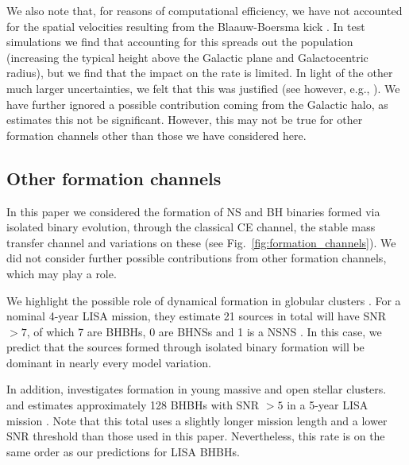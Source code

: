 We also note that, for reasons of computational efficiency, we have not accounted for the spatial velocities resulting from the Blaauw-Boersma kick \citep{Blaauw+1961,Boersma1961}. In test simulations we find that accounting for this spreads out the population (increasing the typical height above the Galactic plane and Galactocentric radius), but we find that the impact on the rate is limited. In light of the other much larger uncertainties, we felt that this was justified (see however, e.g., \citealt{Brandt+1995, Abbott+2017_GW170817_progenitor}). We have further ignored a possible contribution coming from the Galactic halo, as \citet{Lamberts+2018} estimates this not be significant. However, this may not be true for other formation channels other than those we have considered here.

\subsection{Other formation channels}

In this paper we considered the formation of NS and BH binaries formed via isolated binary evolution, through the classical CE channel, the stable mass transfer channel and variations on these (see Fig.~\ref{fig:formation_channels}). We did not consider further possible contributions from other formation channels, which may play a role.

We highlight the possible role of dynamical formation in globular clusters \citet[e.g.\ ][]{Kremer+2018}. For a nominal 4-year LISA mission, they estimate 21 sources  in total will have SNR $> 7$, of which 7 are BHBHs, 0 are BHNSs and 1 is a NSNS \citep[see Table~1][]{Kremer+2018}. In this case, we predict that the sources formed through isolated binary formation will be dominant in nearly every model variation.

In addition, \citet{Banerjee+2020} investigates formation in young massive and open stellar clusters. and estimates approximately 128 BHBHs with SNR $>5$ in a 5-year LISA mission \citep[see Table~1, Column 9][]{Banerjee+2020}. Note that this total uses a slightly longer mission length and a lower SNR threshold than those used in this paper. Nevertheless, this rate is on the same order as our predictions for LISA BHBHs.
